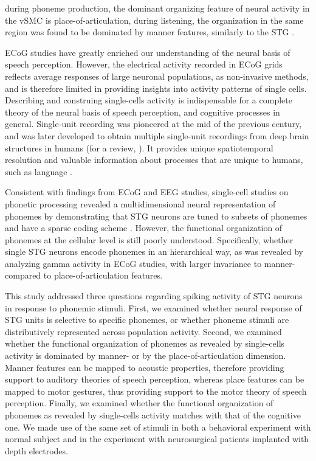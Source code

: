 during phoneme production, the dominant organizing feature of neural activity in the vSMC is place-of-articulation, during listening, the organization in the same region was found to be dominated by manner features, similarly to the STG \citep{cheung2016auditory}.

ECoG studies have greatly enriched our understanding of the neural basis of speech perception.  However, the electrical activity recorded in ECoG grids reflects average responses of large neuronal populations, as non-invasive methods, and is therefore limited in providing insights into activity patterns of single cells. Describing and construing single-cells activity is indispensable for a complete theory of the neural basis of speech perception, and cognitive processes in general. Single-unit recording was pioneered at the mid of the previous century, and was later developed to obtain multiple single-unit recordings from deep brain structures in humans \citep{fried1999cerebral} (for a review, \citealp{engel2005invasive, mukamel2012human, cash2015emergence}). It provides unique spatiotemporal resolution and valuable information about processes that are unique to humans, such as language \citep{heit1988neural, creutzfeldt1989neuronal, tankus2012structured, ossmy2015decoding}.

Consistent with findings from ECoG and EEG studies, single-cell studies on phonetic processing revealed a multidimensional neural representation of phonemes by demonstrating that STG neurons are tuned to subsets of phonemes and have a sparse coding scheme \citep{creutzfeldt1989neuronal, chan2013speech}. However, the functional organization of phonemes at the cellular level is still poorly understood. Specifically, whether single STG neurons encode phonemes in an hierarchical way, as was revealed by analyzing gamma activity in ECoG studies, with larger invariance to manner- compared to place-of-articulation features.

This study addressed three questions regarding spiking activity of STG neurons in response to phonemic stimuli. First, we examined whether neural response of STG units is selective to specific phonemes, or whether phoneme stimuli are distributively represented across population activity. Second, we examined whether the functional organization of phonemes as revealed by single-cells activity is dominated by manner- or by the place-of-articulation dimension. Manner features can be mapped to acoustic properties, therefore providing support to auditory theories of speech perception, whereas place features can be mapped to motor gestures, thus providing support to the motor theory of speech perception. Finally, we examined whether the functional organization of phonemes as revealed by single-cells activity matches with that of the cognitive one. We made use of the same set of stimuli in both a behavioral experiment with normal subject and in the experiment with neurosurgical patients implanted with depth electrodes.

